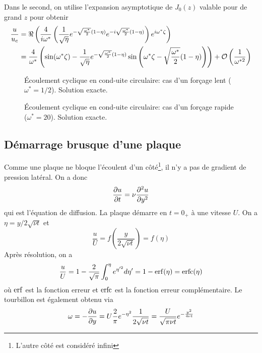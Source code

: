       Dans le second, on utilise l'expansion asymptotique de $J_0(z)$ valable pour de grand $z$ pour obtenir
      \begin{equation}
        \begin{aligned}
          \frac{u}{u_c} &= \real \left(\frac{4}{i\omega^\ast}\left( \recip{\sqrt{\eta}}e^{-\sqrt{\frac{\omega^\ast}{2}}(1-\eta)} e^{-i \sqrt{\frac{\omega^\ast}{2}}(1-\eta)}\right)
          e^{i\omega^\ast \zeta}\right)\\
          &= \frac{4}{\omega^\ast} \left(\sin(\omega^\ast \zeta) - \recip{\sqrt{\eta}}e^{-\sqrt{\frac{\omega^\ast}{2}}(1-\eta)}\sin\left(\omega^\ast \zeta -\sqrt{\frac{\omega^\ast}{2}}(1-\eta) \right)
          \right) + \mathcal{O}\left(\recip{\omega^{\ast 2}}\right)
        \end{aligned}
      \end{equation}
      \begin{figure}[h]
        \centering
        \begin{minipage}[c]{0.45\textwidth}
          
          \caption{Écoulement cyclique en cond-uite circulaire: cas d'un forçage lent ($\omega^\ast = 1/2$). Solution exacte.}
          \label{fig:forcageLent}
        \end{minipage}
        \begin{minipage}[c]{0.45\textwidth}
          
          \caption{Écoulement cyclique en cond-uite circulaire: cas d'un forçage rapide ($\omega^\ast = 20$). Solution exacte.}
          \label{fig:forcageRapide}
        \end{minipage}
      \end{figure}

    \subsection{Démarrage brusque d'une plaque}
      Comme une plaque ne bloque l'écoulent d'un côté\footnote{L'autre côté est considéré infini}, il n'y a pas de gradient de pression latéral. On a donc
      \begin{equation}
        \pdv{u}{t} = \nu \pdv[2]{u}{y}
      \end{equation}
      qui est l'équation de diffusion. La plaque démarre en $t=0_+$ à une vitesse $U$. On a $\eta = y/2\sqrt{\nu t}$ et
      \begin{equation}
        \frac{u}{U} = f\left(\frac{y}{2\sqrt{\nu t}}\right) = f(\eta)
      \end{equation}
      Après résolution,  on a
      \begin{equation}
        \frac{u}{U} = 1 - \frac{2}{\sqrt{\pi}}\int_0^\eta e^{\eta'^2} d\eta'  = 1-\erf(\eta) = \erfc(\eta)
      \end{equation}
      où $\erf$ est la fonction erreur et $\textrm{erfc}$ est la fonction erreur complémentaire.
      Le tourbillon est également obtenu via
      \begin{equation}
        \omega = -\pdv{u}{y} = U \frac{2}{\pi} e^{-\eta^2} \frac{1}{2\sqrt{\nu t}} = \frac{U}{\sqrt{\pi\nu t}}e^{-\frac{y^2}{4\nu t}}
      \end{equation}

